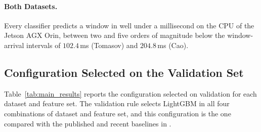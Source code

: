 \paragraph[Both Datasets]{Both Datasets.}
Every classifier predicts a window in well under a millisecond on the CPU of the Jetson AGX Orin, between two and five orders of magnitude below the window-arrival intervals of $102.4$\,ms (Tomasov) and $204.8$\,ms (Cao).

\subsection{Configuration Selected on the Validation Set}
\label{sec:resSelected}
Table~\ref{tab:main_results} reports the configuration selected on validation for each dataset and feature set. The validation rule selects LightGBM in all four combinations of dataset and feature set, and this configuration is the one compared with the published and recent baselines in .

\begin{table}[!htbp]
	\centering
	\caption{Selected configuration on the Tomasov and Cao datasets under the leakage-controlled protocol, measuring segment-level generalisation within represented recordings. Model and balancing strategy selected on validation; test metrics reported once; classification time per window on the CPU of the Jetson AGX Orin.}
	\label{tab:main_results}
	\footnotesize
	\setlength{\tabcolsep}{3.5pt}
\end{table}

